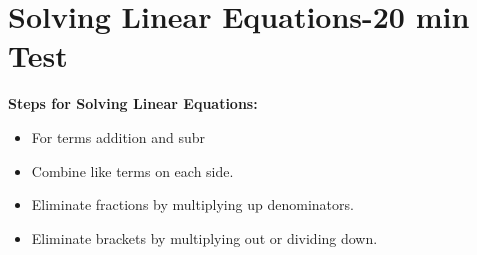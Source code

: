 \documentclass[12pt, a4paper, addpoints]{exam}
\begin{document}
\section*{Solving Linear Equations-20 min Test}

\begin{mdframed}[backgroundcolor=gray!20] %
\textbf{Steps for Solving Linear Equations:}
\begin{itemize}
    \item For terms addition and subr
    \item Combine like terms on each side.
    \item Eliminate fractions by multiplying up denominators.
   \item Eliminate brackets  by multiplying out or dividing down.
\end{itemize}
\end{mdframed}
\end{document}
